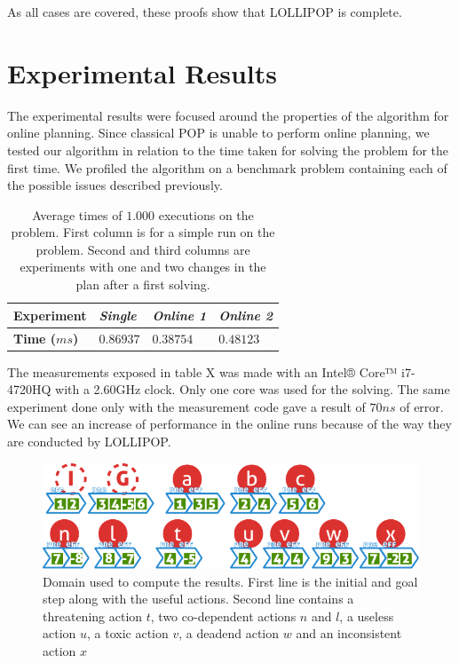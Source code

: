 As all cases are covered, these proofs show that LOLLIPOP is complete.

\section{Experimental Results}\label{sec:results}

The experimental results were focused around the properties of the
algorithm for online planning. Since classical POP is unable to perform
online planning, we tested our algorithm in relation to the time taken
for solving the problem for the first time. We profiled the algorithm on
a benchmark problem containing each of the possible issues described
previously.

\begin{table}\footnotesize
\centering

\caption{\label{tbl:results}Average times of \(1.000\) executions on the
problem. First column is for a simple run on the problem. Second and
third columns are experiments with one and two changes in the plan after
a first solving. }

\begin{tabular}{@{}llll@{}}
\toprule

\textbf{Experiment} & \emph{Single} & \emph{Online 1} & \emph{Online
2} \\\midrule

\textbf{Time (\(ms\))} & \(0.86937\) & \(0.38754\) & \(0.48123\) \\

\bottomrule
\end{tabular}

\end{table}

The measurements exposed in table X was made with an Intel® Core™
i7-4720HQ with a 2.60GHz clock. Only one core was used for the solving.
The same experiment done only with the measurement code gave a result of
\(70 ns\) of error. We can see an increase of performance in the online
runs because of the way they are conducted by LOLLIPOP.

\begin{figure}[htbp]
\centering
\includegraphics{graphics/experiment.pdf}
\caption{\label{fig:experiment}Domain used to compute the results. First
line is the initial and goal step along with the useful actions. Second
line contains a threatening action \(t\), two co-dependent actions \(n\)
and \(l\), a useless action \(u\), a toxic action \(v\), a deadend
action \(w\) and an inconsistent action \(x\)}
\end{figure}

